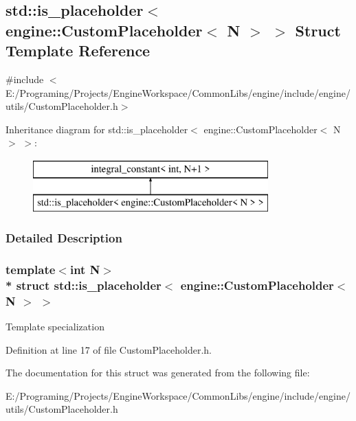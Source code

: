 \hypertarget{a00049}{}\subsection{std\+:\+:is\+\_\+placeholder$<$ engine\+:\+:Custom\+Placeholder$<$ N $>$ $>$ Struct Template Reference}
\label{a00049}


{\ttfamily \#include $<$E\+:/\+Programing/\+Projects/\+Engine\+Workspace/\+Common\+Libs/engine/include/engine/utils/\+Custom\+Placeholder.\+h$>$}

Inheritance diagram for std\+:\+:is\+\_\+placeholder$<$ engine\+:\+:Custom\+Placeholder$<$ N $>$ $>$\+:\begin{figure}[H]
\begin{center}
\leavevmode
\includegraphics[height=2.000000cm]{a00049}
\end{center}
\end{figure}


\subsubsection{Detailed Description}
\subsubsection*{template$<$int N$>$\\*
struct std\+::is\+\_\+placeholder$<$ engine\+::\+Custom\+Placeholder$<$ N $>$ $>$}

Template specialization 

Definition at line 17 of file Custom\+Placeholder.\+h.



The documentation for this struct was generated from the following file\+:\begin{DoxyCompactItemize}
\item 
E\+:/\+Programing/\+Projects/\+Engine\+Workspace/\+Common\+Libs/engine/include/engine/utils/Custom\+Placeholder.\+h\end{DoxyCompactItemize}
